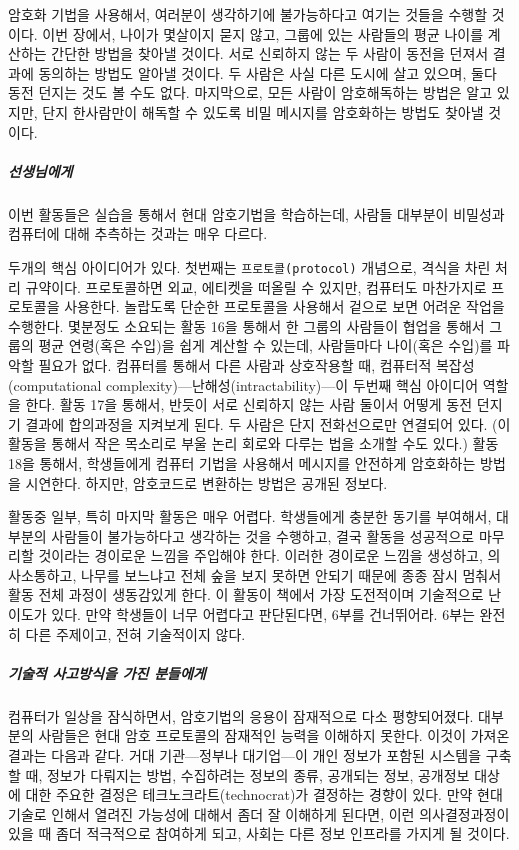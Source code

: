 \documentclass[]{article}
\begin{document}
암호화 기법을 사용해서, 여러분이 생각하기에 불가능하다고 여기는 것들을
수행할 것이다. 이번 장에서, 나이가 몇살이지 묻지 않고, 그룹에 있는
사람들의 평균 나이를 계산하는 간단한 방법을 찾아낼 것이다. 서로 신뢰하지
않는 두 사람이 동전을 던져서 결과에 동의하는 방법도 알아낼 것이다. 두
사람은 사실 다른 도시에 살고 있으며, 둘다 동전 던지는 것도 볼 수도 없다.
마지막으로, 모든 사람이 암호해독하는 방법은 알고 있지만, 단지 한사람만이
해독할 수 있도록 비밀 메시지를 암호화하는 방법도 찾아낼 것이다.

\subparagraph{선생님에게}\label{section-223}

이번 활동들은 실습을 통해서 현대 암호기법을 학습하는데, 사람들 대부분이
비밀성과 컴퓨터에 대해 추측하는 것과는 매우 다르다.

두개의 핵심 아이디어가 있다. 첫번째는 \texttt{프로토콜(protocol)}
개념으로, 격식을 차린 처리 규약이다. 프로토콜하면 외교, 에티켓을 떠올릴
수 있지만, 컴퓨터도 마찬가지로 프로토콜을 사용한다. 놀랍도록 단순한
프로토콜을 사용해서 겉으로 보면 어려운 작업을 수행한다. 몇분정도
소요되는 활동 16을 통해서 한 그룹의 사람들이 협업을 통해서 그룹의 평균
연령(혹은 수입)을 쉽게 계산할 수 있는데, 사람들마다 나이(혹은 수입)를
파악할 필요가 없다. 컴퓨터를 통해서 다른 사람과 상호작용할 때, 컴퓨터적
복잡성(computational complexity)---난해성(intractability)---이 두번째
핵심 아이디어 역할을 한다. 활동 17을 통해서, 반듯이 서로 신뢰하지 않는
사람 둘이서 어떻게 동전 던지기 결과에 합의과정을 지켜보게 된다. 두
사람은 단지 전화선으로만 연결되어 있다. (이 활동을 통해서 작은 목소리로
부울 논리 회로와 다루는 법을 소개할 수도 있다.) 활동 18을 통해서,
학생들에게 컴퓨터 기법을 사용해서 메시지를 안전하게 암호화하는 방법을
시연한다. 하지만, 암호코드로 변환하는 방법은 공개된 정보다.

활동중 일부, 특히 마지막 활동은 매우 어렵다. 학생들에게 충분한 동기를
부여해서, 대부분의 사람들이 불가능하다고 생각하는 것을 수행하고, 결국
활동을 성공적으로 마무리할 것이라는 경이로운 느낌을 주입해야 한다.
이러한 경이로운 느낌을 생성하고, 의사소통하고, 나무를 보느냐고 전체 숲을
보지 못하면 안되기 때문에 종종 잠시 멈춰서 활동 전체 과정이 생동감있게
한다. 이 활동이 책에서 가장 도전적이며 기술적으로 난이도가 있다. 만약
학생들이 너무 어렵다고 판단된다면, 6부를 건너뛰어라. 6부는 완전히 다른
주제이고, 전혀 기술적이지 않다.

\subparagraph{기술적 사고방식을 가진 분들에게}\label{section-224}

컴퓨터가 일상을 잠식하면서, 암호기법의 응용이 잠재적으로 다소
평향되어졌다. 대부분의 사람들은 현대 암호 프로토콜의 잠재적인 능력을
이해하지 못한다. 이것이 가져온 결과는 다음과 같다. 거대 기관---정부나
대기업---이 개인 정보가 포함된 시스템을 구축할 때, 정보가 다뤄지는 방법,
수집하려는 정보의 종류, 공개되는 정보, 공개정보 대상에 대한 주요한
결정은 테크노크라트(technocrat)가 결정하는 경향이 있다. 만약 현대 기술로
인해서 열려진 가능성에 대해서 좀더 잘 이해하게 된다면, 이런
의사결정과정이 있을 때 좀더 적극적으로 참여하게 되고, 사회는 다른 정보
인프라를 가지게 될 것이다.
\end{document}
